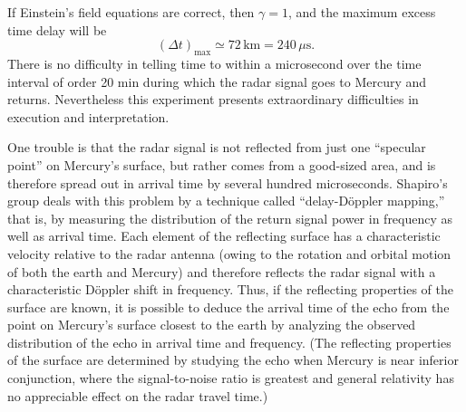 If Einstein's field equations are correct, then \(\gamma=1\), and the
maximum excess time delay will be
\begin{equation}
  (\Delta t)_{\max}\simeq72\,\mathrm{km}=240\,\mu\mathrm{s}.
  \tag{8.7.6}\label{eq:8.7.6}
\end{equation}
There is no difficulty in telling time to within a microsecond over the
time interval of order 20 min during which the radar signal goes to Mercury
and returns. Nevertheless this experiment presents extraordinary
difficulties in execution and interpretation.

One trouble is that the radar signal is not reflected from just one
``specular point'' on Mercury's surface, but rather comes from a good-sized
area, and is therefore spread out in arrival time by several hundred
microseconds. Shapiro's group deals with this problem by a technique called
``delay-D\"oppler mapping,'' that is, by measuring the distribution of the
return signal power in frequency as well as arrival time. Each element of
the reflecting surface has a characteristic velocity relative to the radar
antenna (owing to the rotation and orbital motion of both the earth and
Mercury) and therefore reflects the radar signal with a characteristic
D\"oppler shift in frequency. Thus, if the reflecting properties of the
surface are known, it is possible to deduce the arrival time of the echo
from the point on Mercury's surface closest to the earth by analyzing the
observed distribution of the echo in arrival time and frequency. (The
reflecting properties of the surface are determined by studying the echo
when Mercury is near inferior conjunction, where the signal-to-noise ratio
is greatest and general relativity has no appreciable effect on the radar
travel time.)

